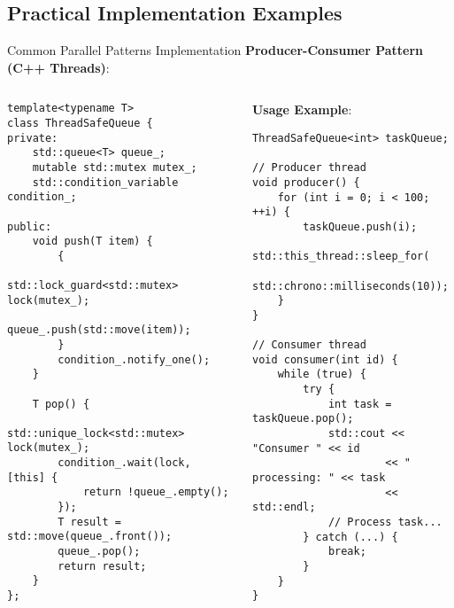 \subsection{Practical Implementation Examples}
\begin{frame}[fragile]{ Common Parallel Patterns Implementation}
	\textbf{Producer-Consumer Pattern (C++ Threads)}:
	\begin{columns}
		\begin{column}{0.5\textwidth}
			\begin{verbatim}
template<typename T>
class ThreadSafeQueue {
private:
    std::queue<T> queue_;
    mutable std::mutex mutex_;
    std::condition_variable condition_;

public:
    void push(T item) {
        {
            std::lock_guard<std::mutex> lock(mutex_);
            queue_.push(std::move(item));
        }
        condition_.notify_one();
    }

    T pop() {
        std::unique_lock<std::mutex> lock(mutex_);
        condition_.wait(lock, [this] {
            return !queue_.empty();
        });
        T result = std::move(queue_.front());
        queue_.pop();
        return result;
    }
};
			\end{verbatim}
		\end{column}
		\begin{column}{0.5\textwidth}
			\textbf{Usage Example}:
			\begin{verbatim}
ThreadSafeQueue<int> taskQueue;

// Producer thread
void producer() {
    for (int i = 0; i < 100; ++i) {
        taskQueue.push(i);
        std::this_thread::sleep_for(
            std::chrono::milliseconds(10));
    }
}

// Consumer thread
void consumer(int id) {
    while (true) {
        try {
            int task = taskQueue.pop();
            std::cout << "Consumer " << id
                     << " processing: " << task
                     << std::endl;
            // Process task...
        } catch (...) {
            break;
        }
    }
}
			\end{verbatim}
		\end{column}
	\end{columns}
\end{frame}

